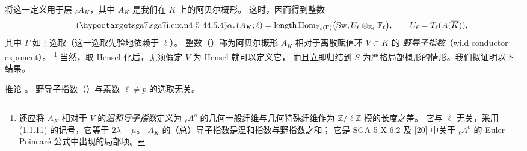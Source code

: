 将这一定义用于层 ${}_\ell A_K$，其中 $A_K$ 是我们在 $K$ 上的阿贝尔概形。
这时，因而得到整数
\begin{equation}\tag{\SGARefTarget{sga7.sga7i.eix.n4-5-4}{4.5.4}}
 \alpha_s(A_K;\ell)
 =\operatorname{length}
   \operatorname{Hom}_{\mathbb Z_\ell(\Gamma)}
   \bigl(\operatorname{Sw},
         U_\ell\otimes_{\mathbb Z_\ell}\mathbb F_\ell\bigr),
 \qquad
 U_\ell=T_\ell(A(\overline K)),
\end{equation}
其中 $\Gamma$ 如上选取（这一选取先验地依赖于 $\ell$）。
整数（）称为阿贝尔概形 $A_K$ 相对于离散赋值环 $V\subset K$ 的
\emph{野导子指数}（wild conductor exponent）。
\footnote{还应将 $A_K$ 相对于 $V$ 的\emph{温和导子指数}定义为
${}_\ell A^o$ 的几何一般纤维与几何特殊纤维作为 $\mathbb Z/\ell\mathbb Z$ 模的长度之差。
它与 $\ell$ 无关，采用 (1.1.11) 的记号，它等于 $2\lambda+\mu$。
$A_K$ 的（总）导子指数是温和指数与野指数之和；
它是 SGA 5 X 6.2 及 [20] 中关于 ${}_\ell A^o$ 的 Euler--Poincar\'e 公式中出现的局部项。}
当然，取 Hensel 化后，无须假定 $V$ 为 Hensel 就可以定义它，
而且立即归结到 $S$ 为严格局部概形的情形。我们拟证明以下结果。

\medskip
\noindent
\underline{推论} 。
\underline{野导子指数（）与素数 $\ell\neq p$ 的选取无关。}

